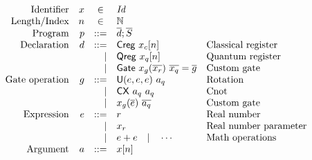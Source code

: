 \begin{figure}[t]
	\[
		\begin{array}{@{}rrrll@{}}
			\text{Identifier}        & x                            & \multicolumn{1}{c}{\in} & \embox{Id}                                                                \\
			\text{Length/Index}      & n                            & \multicolumn{1}{c}{\in} & \mathbb{N}                                                                \\
			\text{Program}           & p                            & ::=                     & \rep{d};\rep{S}                                                           \\
			\text{Declaration}       & d                            & ::=                     & \dcreg{x_c}{n}                             & \text{Classical register}    \\
			                         &                              & |                       & \dqreg{x_q}{n}                             & \text{Quantum register}      \\
			                         &                              & |                       & \dgate{x_g}{\rep{x_r}}{\rep{x_q}}{\rep{g}} & \text{Custom gate}           \\
			\text{Gate operation}    & g                            & ::=                     & \irotate{e}{e}{e}{a_q}                     & \text{Rotation}              \\
			                         &                              & |                       & \icnot{a_q}{a_q}                           & \text{Cnot}                  \\
			                         &                              & |                       & \icustom{x_g}{\rep{e}}{\rep{a_q}}          & \text{Custom gate}           \\
			\text{Expression}        & e                            & ::=                     & r                                          & \text{Real number}           \\
			                         &                              & |                       & x_r                                        & \text{Real number parameter} \\
			                         &                              & |                       & e+e\quad|\quad\cdots                       & \text{Math operations}       \\
			\text{Argument}          & a                            & ::=                     & x[n]

\end{array}\]
\end{figure}
